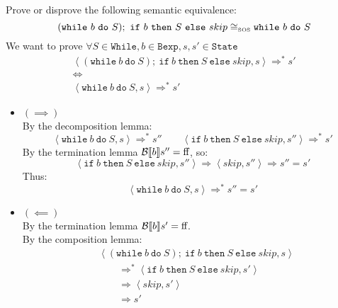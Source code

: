 \begin{exercise}{
    Prove or disprove the following semantic equivalence:
    \[ (\texttt{while}\ b\ \texttt{do}\ S);\ \texttt{if}\ b\ \texttt{then}\ S\ \texttt{else}\ skip \cong_{\text{\tiny SOS}} \texttt{while}\ b\ \texttt{do}\ S \]\vspace*{-0.6cm}
}
    We want to prove $\forall S \in \texttt{While}, b \in \texttt{Bexp}, s, s' \in \texttt{State}$
    \begin{gather*}
        \left<(\texttt{while}\ b\ \texttt{do}\ S);\ \texttt{if}\ b\ \texttt{then}\ S\ \texttt{else}\ skip, s\right> \Rightarrow^* s' \\
        \iff \\
        \left<\texttt{while}\ b\ \texttt{do}\ S, s\right> \Rightarrow^* s'
    \end{gather*}
    \begin{itemize}
        \item $(\implies)$ \vspace{0.2cm} \\
            By the decomposition lemma:\vspace*{-0.3cm}
            \[ \left<\texttt{while}\ b\ \texttt{do}\ S, s\right> \Rightarrow^* s'' \qquad \left<\texttt{if}\ b\ \texttt{then}\ S\ \texttt{else}\ skip, s''\right> \Rightarrow^* s' \]
            By the termination lemma $\mathcal{B} \llbracket b \rrbracket s'' = \text{ff}$, so:\vspace*{-0.3cm}
            \[ \left<\texttt{if}\ b\ \texttt{then}\ S\ \texttt{else}\ skip, s''\right> \Rightarrow \left<skip, s''\right> \Rightarrow s'' = s' \]
            Thus:
            \[ \left<\texttt{while}\ b\ \texttt{do}\ S, s\right> \Rightarrow^* s'' = s' \]
        \item $(\impliedby)$ \vspace{0.2cm} \\
            By the termination lemma $\mathcal{B} \llbracket b \rrbracket s' = \text{ff}$. \\
            By the composition lemma:\vspace*{-0.3cm}
            \begin{align*}
                &\left<(\texttt{while}\ b\ \texttt{do}\ S);\ \texttt{if}\ b\ \texttt{then}\ S\ \texttt{else}\ skip, s\right>
                \\&\qquad \Rightarrow^* \left<\texttt{if}\ b\ \texttt{then}\ S\ \texttt{else}\ skip, s'\right>
                \\&\qquad \Rightarrow \left<skip, s'\right>
                \\&\qquad \Rightarrow s'
            \end{align*}
    \end{itemize}
\end{exercise}
